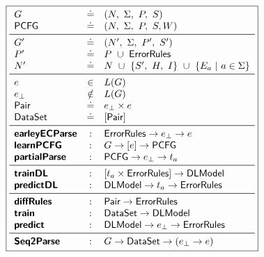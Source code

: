 \begin{figure}[h]
\small
\begin{minipage}[c]{\linewidth}
  \lstDeleteShortInline{|}
  \[
  \boxed{
  \begin{array}{lcl}
    G              & \defeq  & (N,\ \Sigma,\ P,\ S) \\
    \pcfgsym       & \defeq  & (N,\ \Sigma,\ P,\ S, W) \\
    \midrule
    G'             & \defeq  & (N',\ \Sigma,\ P',\ S') \\
    P'             & \defeq  & P\ \cup\ \errorrulessym \\
    N'             & \defeq  & N\ \cup\ \{S',\ H,\ I\}\ \cup\ \{E_a\ |\ a \in \Sigma\} \\
    \midrule
    e              & \in    & L(G) \\
    e_{\bot}       & \notin & L(G) \\
    \pairsym       & \defeq & e_{\bot} \times e \\
    \datasetsym    & \defeq & \List{\pairsym} \\
    \midrule
    \ecepsym       & : & \errorrulessym \to e_{\bot} \to e \\
    \learnPCFGsym  & : & G \to \List{e} \to \pcfgsym \\
    \partialsym    & : & \pcfgsym \to e_{\bot} \to t_a  \\
    \midrule
    \trainDLsym    & : & \List{t_a \times \errorrulessym} \to \Model \\
    \predictDLsym  & : & \Model \to t_a \to \errorrulessym \\
    \midrule
    \diffsym       & : & \pairsym \to \errorrulessym \\
    \trainsym      & : & \datasetsym \to \Model \\
    \predictsym    & : & \Model \to e_{\bot} \to \errorrulessym \\
    \midrule
    \systemsym     & : & G \to \datasetsym \to (e_{\bot} \to e) \\
  \end{array}
  }
  \]
  \lstMakeShortInline[mathescape=true]{|}
  \label{fig:api}
\end{minipage}
\end{figure}
